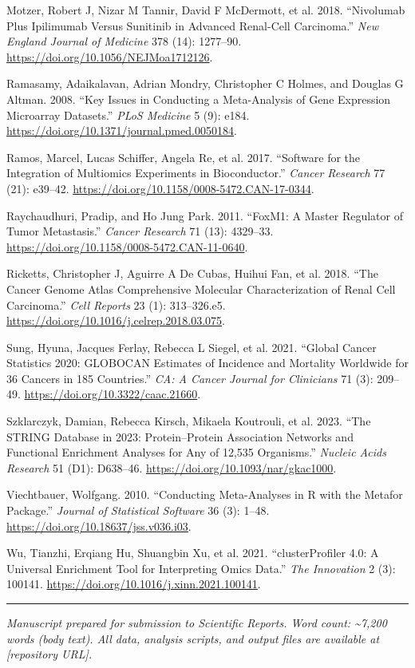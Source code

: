 \documentclass[
  12pt,
]{article}
\newlength{\cslhangindent}
\newenvironment{CSLReferences}[2] %
 {\begin{list}{}{%
  \setlength{\itemindent}{0pt}
  \setlength{\leftmargin}{0pt}
  \setlength{\parsep}{0pt}
  \ifodd #1
   \setlength{\leftmargin}{\cslhangindent}
   \setlength{\itemindent}{-1\cslhangindent}
  \fi
  \setlength{\itemsep}{#2\baselineskip}}}
 {\end{list}}
\begin{document}
\begin{CSLReferences}{1}{1}
Motzer, Robert J, Nizar M Tannir, David F McDermott, et al. 2018.
{``Nivolumab Plus Ipilimumab Versus Sunitinib in Advanced Renal-Cell
Carcinoma.''} \emph{New England Journal of Medicine} 378 (14): 1277--90.
\url{https://doi.org/10.1056/NEJMoa1712126}.

Ramasamy, Adaikalavan, Adrian Mondry, Christopher C Holmes, and Douglas
G Altman. 2008. {``Key Issues in Conducting a Meta-Analysis of Gene
Expression Microarray Datasets.''} \emph{PLoS Medicine} 5 (9): e184.
\url{https://doi.org/10.1371/journal.pmed.0050184}.

Ramos, Marcel, Lucas Schiffer, Angela Re, et al. 2017. {``Software for
the Integration of Multiomics Experiments in {Bioconductor}.''}
\emph{Cancer Research} 77 (21): e39--42.
\url{https://doi.org/10.1158/0008-5472.CAN-17-0344}.

Raychaudhuri, Pradip, and Ho Jung Park. 2011. {``{FoxM1}: A Master
Regulator of Tumor Metastasis.''} \emph{Cancer Research} 71 (13):
4329--33. \url{https://doi.org/10.1158/0008-5472.CAN-11-0640}.

Ricketts, Christopher J, Aguirre A De Cubas, Huihui Fan, et al. 2018.
{``The Cancer Genome Atlas Comprehensive Molecular Characterization of
Renal Cell Carcinoma.''} \emph{Cell Reports} 23 (1): 313--326.e5.
\url{https://doi.org/10.1016/j.celrep.2018.03.075}.

Sung, Hyuna, Jacques Ferlay, Rebecca L Siegel, et al. 2021. {``Global
Cancer Statistics 2020: {GLOBOCAN} Estimates of Incidence and Mortality
Worldwide for 36 Cancers in 185 Countries.''} \emph{CA: A Cancer Journal
for Clinicians} 71 (3): 209--49.
\url{https://doi.org/10.3322/caac.21660}.

Szklarczyk, Damian, Rebecca Kirsch, Mikaela Koutrouli, et al. 2023.
{``The {STRING} Database in 2023: Protein--Protein Association Networks
and Functional Enrichment Analyses for Any of 12,535 Organisms.''}
\emph{Nucleic Acids Research} 51 (D1): D638--46.
\url{https://doi.org/10.1093/nar/gkac1000}.

Viechtbauer, Wolfgang. 2010. {``Conducting Meta-Analyses in {R} with the
Metafor Package.''} \emph{Journal of Statistical Software} 36 (3):
1--48. \url{https://doi.org/10.18637/jss.v036.i03}.

Wu, Tianzhi, Erqiang Hu, Shuangbin Xu, et al. 2021. {``{clusterProfiler}
4.0: {A} Universal Enrichment Tool for Interpreting Omics Data.''}
\emph{The Innovation} 2 (3): 100141.
\url{https://doi.org/10.1016/j.xinn.2021.100141}.

\end{CSLReferences}

\begin{center}\rule{0.5\linewidth}{0.5pt}\end{center}

\emph{Manuscript prepared for submission to Scientific Reports. Word
count: \textasciitilde7,200 words (body text). All data, analysis
scripts, and output files are available at {[}repository URL{]}.}
\end{document}
